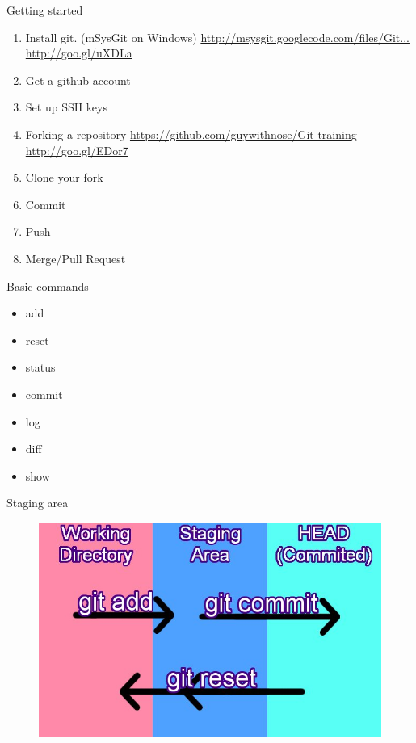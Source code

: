 \documentclass[14pt]{beamer}
\begin{document}
\begin{frame}{Getting started}
	\begin{enumerate}
		\small
		\item Install git. (mSysGit on Windows)\newline
		\href{http://msysgit.googlecode.com/files/Git-1.7.11-preview20120710.exe}{http://msysgit.googlecode.com/files/Git...}
		\href{http://goo.gl/uXDLa}{http://goo.gl/uXDLa}
		\item Get a github account
		\item Set up SSH keys
		\item Forking a repository\newline
		\href{https://github.com/guywithnose/Git-training}{https://github.com/guywithnose/Git-training}
		\href{http://goo.gl/EDor7}{http://goo.gl/EDor7}
		\item Clone your fork
		\item Commit
		\item Push
		\item Merge/Pull Request
	\end{enumerate}
\end{frame}


\begin{frame}{Basic commands}
	\begin{itemize}
		\item add
		\item reset
		\item status
		\item commit
		\item log
		\item diff
		\item show
	\end{itemize}
\end{frame}

\begin{frame}{Staging area}
	\begin{figure}[htb]
		\centering
		\includegraphics[width=\textwidth]{commit-add-reset.jpg}
	\end{figure}
\end{frame}
\end{document}
